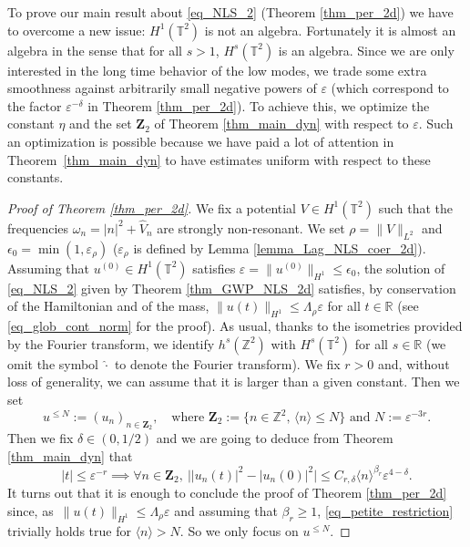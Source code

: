 To prove our main result about \eqref{eq_NLS_2} (\ie Theorem \ref{thm_per_2d}) we have to overcome a new issue: $H^1(\mathbb{T}^2)$ is not an algebra. Fortunately it is almost an algebra in the sense that for all $s>1$, $H^s(\mathbb{T}^2)$ is an algebra. Since we are only interested in the long time behavior of the low modes, we trade some extra smoothness against arbitrarily small negative powers of $\varepsilon$ (which correspond to the factor $\varepsilon^{-\delta}$ in Theorem \ref{thm_per_2d}). To achieve this, we optimize the constant $\eta$ and the set $\mathbf{Z}_2$ of Theorem \ref{thm_main_dyn} with respect to $\varepsilon$. Such an optimization is possible because we have paid a lot of attention in Theorem~\ref{thm_main_dyn} to have estimates uniform with respect to these constants.

\begin{proof}[Proof of Theorem \ref{thm_per_2d}] We fix a potential $V\in H^1(\mathbb{T}^2)$ such that the frequencies $\omega_n = |n|^2 + \widehat{V}_n$ are strongly non-resonant. We set $\rho = \|V\|_{L^2}$ and $\epsilon_0 = \min(1,\varepsilon_{\rho})$ ($\varepsilon_{\rho}$ is defined by Lemma \ref{lemma_Lag_NLS_coer_2d}). Assuming that $u^{(0)}\in H^1(\mathbb{T}^2)$ satisfies $\varepsilon = \| u^{(0)} \|_{H^1} \leq \epsilon_0$, the solution of \eqref{eq_NLS_2} given by Theorem \ref{thm_GWP_NLS_2d} satisfies, by conservation of the Hamiltonian and of the mass, $\| u(t) \|_{H^1}\leq \Lambda_\rho \varepsilon$ for all $t\in \mathbb{R}$ (see \eqref{eq_glob_cont_norm} for the proof). As usual, thanks to the isometries provided by the Fourier transform, we identify $h^s(\mathbb{Z}^2)$ with $H^s(\mathbb{T}^2)$ for all $s\in \mathbb{R}$ (we omit the symbol $\widehat{\cdot}$ to denote the Fourier transform). We fix $r>0$ and, without loss of generality, we can assume that it is larger than a given constant. Then we set
\[
u^{\leq N}:= (u_n)_{n\in \mathbf{Z}_2}, \quad \text{where } \mathbf{Z}_2:= \{ n \in\mathbb{Z}^2, \, \langle n \rangle \leq N\} \text{ and } N:= \varepsilon^{-3r}.
\]
Then we fix $\delta\in (0,1/2)$ and we are going to deduce from Theorem \ref{thm_main_dyn} that
\begin{equation}
\label{eq_petite_restriction}
|t| \leq \varepsilon^{-r} \implies \forall n \in \mathbf{Z}_2, \ \bigl||u_n(t)|^2 - |u_n(0)|^2 \bigr| \leq C_{r,\delta} \langle n \rangle^{\beta_r} \varepsilon^{4-\delta}.
\end{equation}
It turns out that it is enough to conclude the proof of Theorem \ref{thm_per_2d} since, as~$\|u(t)\|_{H^1} \leq \Lambda_\rho \varepsilon$ and assuming that $\beta_r\geq 1$, \eqref{eq_petite_restriction} trivially holds true for $\langle n \rangle > N$. So we only focus on $u^{\leq N}$.


\end{proof}

